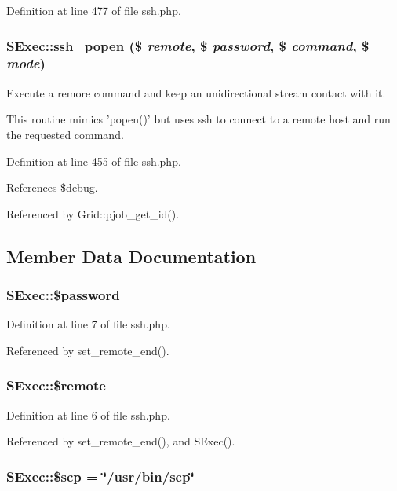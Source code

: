 Definition at line 477 of file ssh.php.
\subsubsection{\setlength{\rightskip}{0pt plus 5cm}SExec::ssh\_\-popen (\$ {\em remote}, \$ {\em password}, \$ {\em command}, \$ {\em mode})}\label{classSExec_a9}


Execute a remore command and keep an unidirectional stream contact with it. 

This routine mimics 'popen()' but uses ssh to connect to a remote host and run the requested command. 

Definition at line 455 of file ssh.php.

References \$debug.

Referenced by Grid::pjob\_\-get\_\-id().

\subsection{Member Data Documentation}
\subsubsection{\setlength{\rightskip}{0pt plus 5cm}SExec::\$password}\label{classSExec_o2}




Definition at line 7 of file ssh.php.

Referenced by set\_\-remote\_\-end().
\subsubsection{\setlength{\rightskip}{0pt plus 5cm}SExec::\$remote}\label{classSExec_o1}




Definition at line 6 of file ssh.php.

Referenced by set\_\-remote\_\-end(), and SExec().
\subsubsection{\setlength{\rightskip}{0pt plus 5cm}SExec::\$scp = \char`\"{}/usr/bin/scp\char`\"{}}\label{classSExec_o4}




